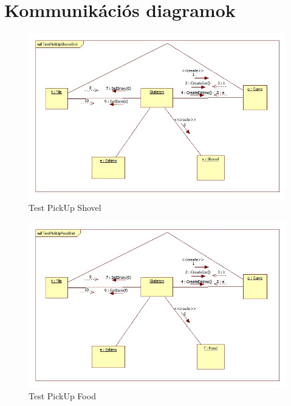 \pagebreak
\section{Kommunikációs diagramok}

\begin{figure}[h]
	\begin{center}
		\includegraphics[width=17cm]{chapters/chapter05/diagrams/TestPickUpShovelInit.jpg}
		\caption{Test PickUp Shovel}
		\label{fig:Test PickUp Shovel}
	\end{center}
\end{figure}

\begin{figure}[h]
	\begin{center}
		\includegraphics[width=17cm]{chapters/chapter05/diagrams/TestPickUpFoodInit.jpg}
		\caption{Test PickUp Food}
		\label{fig:Test PickUp Food}
	\end{center}
\end{figure}

